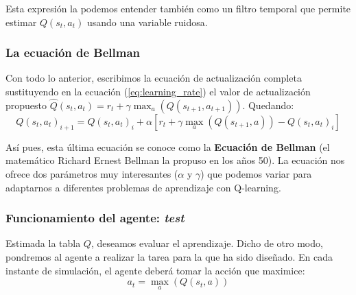 \documentclass{article}
\begin{document}
Esta expresión la podemos entender también como un filtro temporal que permite estimar $Q(s_t,a_t)$ usando una variable ruidosa.

\subsubsection{La ecuación de Bellman}
Con todo lo anterior, escribimos la ecuación de actualización completa sustituyendo en la ecuación (\ref{eq:learning_rate}) el valor de actualización propuesto $\hat{Q}(s_t,a_t) = r_t + \gamma 
\max_a(Q(s_{t+1},a_{t+1}))$. Quedando:
\begin{equation}
Q(s_t,a_t)_{i+1} = Q(s_t,a_t)_{i} + \alpha [r_t + \gamma 
\max_a(Q(s_{t+1},a))- Q(s_t,a_t)_{i}]  
\end{equation}

Así pues, esta última ecuación se conoce como la \textbf{Ecuación de Bellman} (el matemático Richard Ernest Bellman la propuso en los años 50). La ecuación nos ofrece dos parámetros muy interesantes ($\alpha$ y $\gamma$) que podemos variar para adaptarnos a diferentes problemas de aprendizaje con Q-learning.

\subsubsection{Funcionamiento del agente: \textit{test}}

Estimada la tabla $Q$, deseamos evaluar el aprendizaje. Dicho de otro modo, pondremos al agente a realizar la tarea para la que ha sido diseñado. En cada instante de simulación, el agente deberá tomar la acción que maximice:
\begin{equation}
a_t = \max_a(Q(s_{t},a))
\end{equation}
\end{document}
